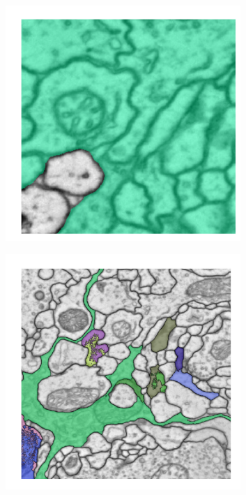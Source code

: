 \begin{figure}
\begin{subfigure}[t]{0.46 \linewidth}
        \centering
        \includegraphics[width=0.98\textwidth]{figs/comparison/max_F.pdf}
    \end{subfigure}%
    \begin{subfigure}[t]{0.46 \linewidth}
        \centering
        \includegraphics[width=0.98\textwidth]{figs/comparison/max_T.pdf}
    \end{subfigure}\hspace{0.5cm}%


\end{figure}
